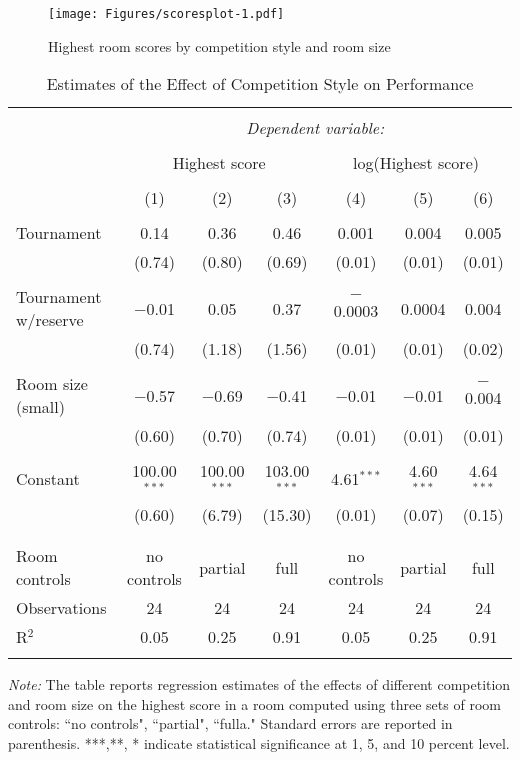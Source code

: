\documentclass[11pt, titlepage]{article}
\begin{document}
\begin{figure}
\caption{Highest room scores by competition style and room size}
\label{scores plot}
\texttt{[image: Figures/scoresplot-1.pdf]}
\end{figure}

\begin{table}
\centering
\caption{Estimates of the Effect of Competition Style on Performance}\label{scores table}
\begin{tabular}{@{}lcccccc}
\\[-1.8ex]\hline 
\hline \\[-1.8ex] 
 & \multicolumn{6}{c}{\textit{Dependent variable:}} \\ 
\cline{2-7} 
\\[-1.8ex] & \multicolumn{3}{c}{Highest score} & \multicolumn{3}{c}{log(Highest score)} \\ 
\\[-1.8ex] & (1) & (2) & (3) & (4) & (5) & (6)\\ 
\hline \\[-1.8ex] 
 Tournament & 0.14 & 0.36 & 0.46 & 0.001 & 0.004 & 0.005 \\ 
  & (0.74) & (0.80) & (0.69) & (0.01) & (0.01) & (0.01) \\ 
  & & & & & & \\ 
 Tournament w/reserve & $-$0.01 & 0.05 & 0.37 & $-$0.0003 & 0.0004 & 0.004 \\ 
  & (0.74) & (1.18) & (1.56) & (0.01) & (0.01) & (0.02) \\ 
  & & & & & & \\ 
 Room size (small) & $-$0.57 & $-$0.69 & $-$0.41 & $-$0.01 & $-$0.01 & $-$0.004 \\ 
  & (0.60) & (0.70) & (0.74) & (0.01) & (0.01) & (0.01) \\ 
  & & & & & & \\ 
 Constant & 100.00$^{***}$ & 100.00$^{***}$ & 103.00$^{***}$ & 4.61$^{***}$ & 4.60$^{***}$ & 4.64$^{***}$ \\ 
  & (0.60) & (6.79) & (15.30) & (0.01) & (0.07) & (0.15) \\ 
  & & & & & & \\ 
\hline \\[-1.8ex] 
Room controls & no controls & partial & full & no controls & partial & full \\ 
Observations & 24 & 24 & 24 & 24 & 24 & 24 \\ 
R$^{2}$ & 0.05 & 0.25 & 0.91 & 0.05 & 0.25 & 0.91 \\ 
\hline 
\hline \\[-1.8ex] 
\end{tabular} 
\begin{minipage}{1.000000\textwidth}
\footnotesize\emph{Note:} The table reports regression estimates of the effects of different competition and room size on the highest score in a room computed using three sets of room controls: ``no controls", ``partial", ``fulla." Standard errors are reported in parenthesis. ***,**, * indicate statistical significance at 1, 5, and 10 percent level.
\end{minipage}
\end{table}
\end{document}
